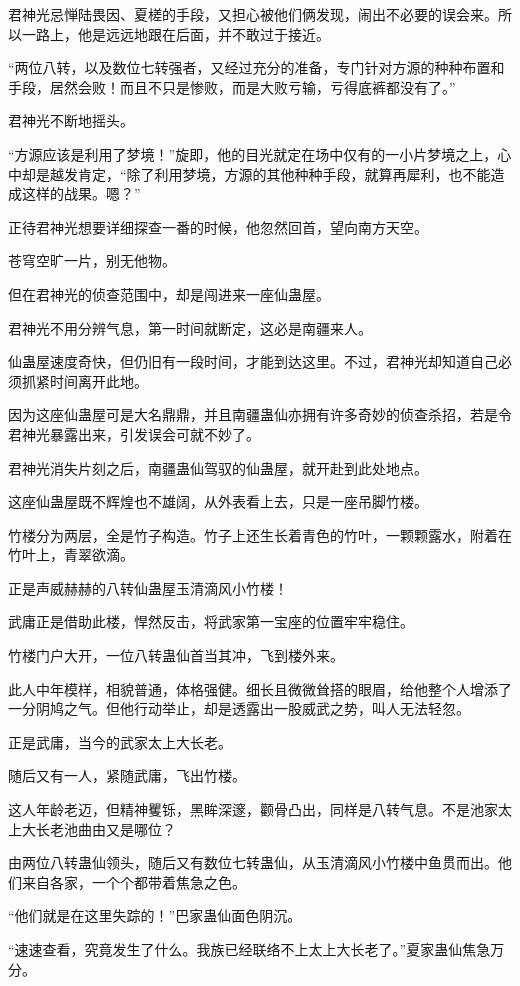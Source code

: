 \begin{this_body}
君神光忌惮陆畏因、夏槎的手段，又担心被他们俩发现，闹出不必要的误会来。所以一路上，他是远远地跟在后面，并不敢过于接近。

“两位八转，以及数位七转强者，又经过充分的准备，专门针对方源的种种布置和手段，居然会败！而且不只是惨败，而是大败亏输，亏得底裤都没有了。”

君神光不断地摇头。

“方源应该是利用了梦境！”旋即，他的目光就定在场中仅有的一小片梦境之上，心中却是越发肯定，“除了利用梦境，方源的其他种种手段，就算再犀利，也不能造成这样的战果。嗯？”

正待君神光想要详细探查一番的时候，他忽然回首，望向南方天空。

苍穹空旷一片，别无他物。

但在君神光的侦查范围中，却是闯进来一座仙蛊屋。

君神光不用分辨气息，第一时间就断定，这必是南疆来人。

仙蛊屋速度奇快，但仍旧有一段时间，才能到达这里。不过，君神光却知道自己必须抓紧时间离开此地。

因为这座仙蛊屋可是大名鼎鼎，并且南疆蛊仙亦拥有许多奇妙的侦查杀招，若是令君神光暴露出来，引发误会可就不妙了。

君神光消失片刻之后，南疆蛊仙驾驭的仙蛊屋，就开赴到此处地点。

这座仙蛊屋既不辉煌也不雄阔，从外表看上去，只是一座吊脚竹楼。

竹楼分为两层，全是竹子构造。竹子上还生长着青色的竹叶，一颗颗露水，附着在竹叶上，青翠欲滴。

正是声威赫赫的八转仙蛊屋玉清滴风小竹楼！

武庸正是借助此楼，悍然反击，将武家第一宝座的位置牢牢稳住。

竹楼门户大开，一位八转蛊仙首当其冲，飞到楼外来。

此人中年模样，相貌普通，体格强健。细长且微微耸搭的眼眉，给他整个人增添了一分阴鸠之气。但他行动举止，却是透露出一股威武之势，叫人无法轻忽。

正是武庸，当今的武家太上大长老。

随后又有一人，紧随武庸，飞出竹楼。

这人年龄老迈，但精神矍铄，黑眸深邃，颧骨凸出，同样是八转气息。不是池家太上大长老池曲由又是哪位？

由两位八转蛊仙领头，随后又有数位七转蛊仙，从玉清滴风小竹楼中鱼贯而出。他们来自各家，一个个都带着焦急之色。

“他们就是在这里失踪的！”巴家蛊仙面色阴沉。

“速速查看，究竟发生了什么。我族已经联络不上太上大长老了。”夏家蛊仙焦急万分。


\end{this_body}
